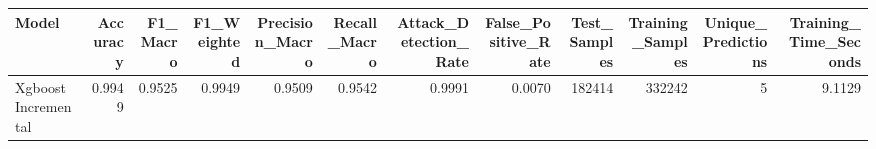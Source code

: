 \begin{tabular}{lrrrrrrrrrrr}
\toprule
Model & Accuracy & F1_Macro & F1_Weighted & Precision_Macro & Recall_Macro & Attack_Detection_Rate & False_Positive_Rate & Test_Samples & Training_Samples & Unique_Predictions & Training_Time_Seconds \\
\midrule
Xgboost Incremental & 0.9949 & 0.9525 & 0.9949 & 0.9509 & 0.9542 & 0.9991 & 0.0070 & 182414 & 332242 & 5 & 9.1129 \\
\bottomrule
\end{tabular}
